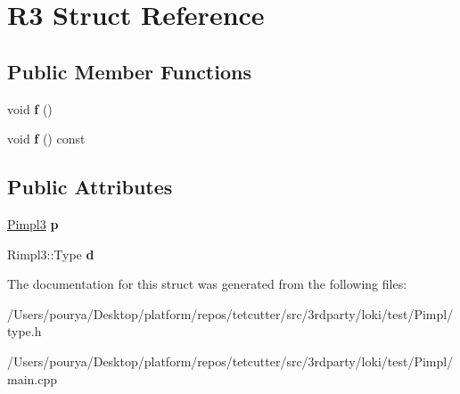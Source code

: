 \hypertarget{structR3}{}\section{R3 Struct Reference}
\label{structR3}
\subsection*{Public Member Functions}
\begin{DoxyCompactItemize}
\item 
\hypertarget{structR3_a41820858f236f67dd2fdb845a59919b1}{}void {\bfseries f} ()\label{structR3_a41820858f236f67dd2fdb845a59919b1}

\item 
\hypertarget{structR3_ada05ebdb49ccd6f478a38390f6a16dfd}{}void {\bfseries f} () const \label{structR3_ada05ebdb49ccd6f478a38390f6a16dfd}

\end{DoxyCompactItemize}
\subsection*{Public Attributes}
\begin{DoxyCompactItemize}
\item 
\hypertarget{structR3_ae4376c74f507bfcf738cff12914daae4}{}\hyperlink{classLoki_1_1Pimpl}{Pimpl3} {\bfseries p}\label{structR3_ae4376c74f507bfcf738cff12914daae4}

\item 
\hypertarget{structR3_a786fdf0116b956f944206a523712a8f1}{}Rimpl3\+::\+Type {\bfseries d}\label{structR3_a786fdf0116b956f944206a523712a8f1}

\end{DoxyCompactItemize}


The documentation for this struct was generated from the following files\+:\begin{DoxyCompactItemize}
\item 
/\+Users/pourya/\+Desktop/platform/repos/tetcutter/src/3rdparty/loki/test/\+Pimpl/type.\+h\item 
/\+Users/pourya/\+Desktop/platform/repos/tetcutter/src/3rdparty/loki/test/\+Pimpl/main.\+cpp\end{DoxyCompactItemize}
